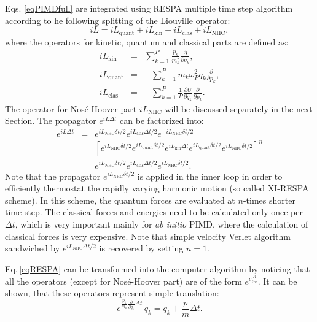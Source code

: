 \documentclass[12pt,a4paper]{article}
\begin{document}
Eqs. \ref{eqPIMDfull} are integrated using RESPA multiple time step algorithm according to he following splitting of the Liouville operator:
\begin{equation}
iL = iL_{\mathrm{quant}}+iL_{\mathrm{kin}}+iL_{\mathrm{clas}}+iL_{\mathrm{NHC}}  ,
\end{equation}
where the operators for kinetic, quantum and classical parts are defined as:
\begin{eqnarray}
iL_{\mathrm{kin}} 	&=& \sum^P_{k=1}\frac{p_k}{m_k^*}\frac{\partial}{\partial q_k}  ,\\
iL_{\mathrm{quant}} 	&=& -\sum^P_{k=1} m_k\omega^2_P q_k\frac{\partial}{\partial p_k}  ,\\
iL_{\mathrm{clas}}  	&=& -\sum^P_{k=1}\frac{1}{P}\frac{\partial U}{\partial q_k}\frac{\partial}{\partial p_k}   .
\end{eqnarray}
The operator for Nosé-Hoover part $iL_{\mathrm{NHC}}$ will be discussed separately in the next Section. The propagator $e^{iL\Delta t}$ can be factorized into: 
\begin{eqnarray}
\label{eqRESPA}
e^{iL\Delta t}&=&e^{iL_{\mathrm{NHC}}\delta t/2}e^{iL_{\mathrm{clas}}\Delta t/2}e^{-iL_{\mathrm{NHC}}\delta t/2}\\
& &\left[e^{iL_{\mathrm{NHC}}\delta t/2}e^{iL_{\mathrm{quant}}\delta t/2}e^{iL_{\mathrm{kin}}\Delta t} e^{iL_{\mathrm{quant}}\delta t/2}e^{iL_{\mathrm{NHC}}\delta t/2}\right]^n \nonumber \\
& & e^{iL_{\mathrm{NHC}}\delta t/2}e^{iL_{\mathrm{clas}}\Delta t/2}e^{iL_{\mathrm{NHC}}\delta t/2}  . \nonumber
\end{eqnarray}
Note that the propagator $e^{iL_{\mathrm{NHC}}\delta t/2}$ is applied in the inner loop in order to efficiently thermostat the rapidly varying harmonic motion (so called XI-RESPA scheme).
In this scheme, the quantum forces are evaluated at $n$-times shorter time step. The classical forces and energies need to be calculated only once per $\Delta t$, which is very important mainly for \textit{ab initio} PIMD, where the calculation of classical forces is very expensive. Note that simple velocity Verlet algorithm sandwiched by $e^{iL_{\mathrm{NHC}}\Delta t/2}$ is recovered by setting $n=1$. 

Eq.\,\ref{eqRESPA} can be transformed into the computer algorithm by noticing  that all the operators (except for Nosé-Hoover part) are of the form $e^{c\frac{\partial}{\partial x}}$. It can be shown, that these operators represent simple translation\cite{Tuckerman_book}:
$$ e^{\frac{p_k}{m_k}\frac{\partial}{\partial q_k}\Delta t}\,q_k =q_k + \frac{p}{m}\Delta t   .$$
\end{document}
